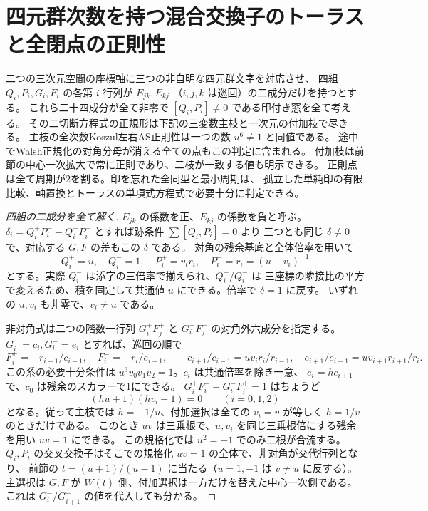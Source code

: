 \section{四元群次数を持つ混合交換子のトーラスと全閉点の正則性}
\label{sec:marked-klein-mixed-torus}
\begin{theorem}\label{thm:marked-klein-mixed-torus}
二つの三次元空間の座標軸に三つの非自明な四元群文字を対応させ、
四組 $Q_i,P_i,G_i,F_i$ の各第 $i$ 行列が $E_{jk},E_{kj}$
（$i,j,k$ は巡回）の二成分だけを持つとする。
これら二十四成分が全て非零で $[Q_i,P_i]\ne0$ である印付き窓を全て考える。
その二切断方程式の正規形は下記の三変数主枝と一次元の付加枝で尽きる。
主枝の全次数Koszul左右AS正則性は一つの数 $u^6\ne1$ と同値である。
途中でWalsh正規化の対角分母が消える全ての点もこの判定に含まれる。
付加枝は前節の中心一次拡大で常に正則であり、二枝が一致する値も明示できる。
正則点は全て周期が2を割る。印を忘れた全同型と最小周期は、
孤立した単純印の有限比較、軸置換とトーラスの単項式方程式で必要十分に判定できる。
\end{theorem}
\begin{proof}[四組の二成分を全て解く]
$E_{jk}$ の係数を正、$E_{kj}$ の係数を負と呼ぶ。
$\delta_i=Q_i^+P_i^--Q_i^-P_i^+$ とすれば跡条件 $\sum[Q_i,P_i]=0$ より
三つとも同じ $\delta\ne0$ で、対応する $G,F$ の差もこの $\delta$ である。
対角の残余基底と全体倍率を用いて
\[
 Q_i^+=u,\quad Q_i^-=1,\quad P_i^+=v_i r_i,\quad P_i^-=r_i=(u-v_i)^{-1}
\]
とする。実際 $Q_i^-$ は添字の三倍率で揃えられ、$Q_i^+/Q_i^-$ は
三座標の隣接比の平方で変えるため、積を固定して共通値 $u$ にできる。倍率で $\delta=1$ に戻す。
いずれの $u,v_i$ も非零で、$v_i\ne u$ である。

非対角式は二つの階数一行列 $G_i^+ F_j^+$ と $G_i^- F_j^-$ の対角外六成分を指定する。
$G_i^+=c_i,G_i^-=e_i$ とすれば、巡回の順で
\[
 F_i^+=-r_{i-1}/c_{i-1},\quad F_i^-=-r_i/e_{i-1},\qquad
 c_{i+1}/c_{i-1}=u v_i r_i/r_{i-1},\quad
 e_{i+1}/e_{i-1}=u v_{i+1}r_{i+1}/r_i .
\]
この系の必要十分条件は $u^3 v_0 v_1 v_2=1$。$c_i$ は共通倍率を除き一意、
$e_i=h c_{i+1}$ で、$c_0$ は残余のスカラーで1にできる。
$G_i^+ F_i^- -G_i^-F_i^+=1$ はちょうど
\[
                        (hu+1)(h v_i-1)=0\qquad (i=0,1,2)
\]
となる。従って主枝では $h=-1/u$、付加選択は全ての $v_i=v$ が等しく $h=1/v$ のときだけである。
このとき $uv$ は三乗根で、$u,v_i$ を同じ三乗根倍にする残余を用い $uv=1$ にできる。
この規格化では $u^2=-1$ でのみ二根が合流する。
$Q_i,P_i$ の交叉交換子はそこでの規格化 $uv=1$ の全体で、非対角が交代行列となり、
前節の $t=(u+1)/(u-1)$ に当たる（$u=1,-1$ は $v\ne u$ に反する）。
主選択は $G,F$ が $W(t)$ 側、付加選択は一方だけを替えた中心一次側である。
これは $G_i^-/G_{i+1}^+$ の値を代入しても分かる。
\end{proof}

